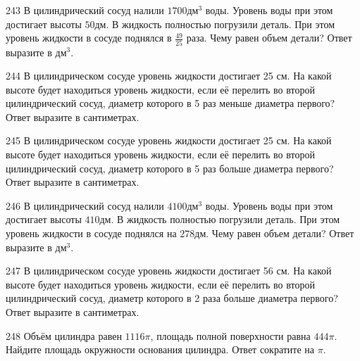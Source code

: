 \documentclass[4apaper]{article}
\begin{document}
\begin{taskBN}{243}
В цилиндрический сосуд налили $1700\mbox{дм}^3$ воды. Уровень воды при этом достигает высоты $50$дм. В жидкость полностью погрузили деталь. При этом уровень жидкости в сосуде поднялся в $\frac{49}{25}$ раза. Чему равен объем детали? Ответ выразите в $\mbox{дм}^3$.
\end{taskBN}

\begin{taskBN}{244}
В цилиндрическом сосуде уровень жидкости достигает 25 см. На какой высоте будет находиться уровень жидкости, если её перелить во второй цилиндрический сосуд, диаметр которого в 5 раз меньше диаметра первого? Ответ выразите в сантиметрах.
\end{taskBN}

\begin{taskBN}{245}
В цилиндрическом сосуде уровень жидкости достигает 25 см. На какой высоте будет находиться уровень жидкости, если её перелить во второй цилиндрический сосуд, диаметр которого в 5 раз больше диаметра первого? Ответ выразите в сантиметрах.
\end{taskBN}

\begin{taskBN}{246}
В цилиндрический сосуд налили $4100\mbox{дм}^3$ воды. Уровень воды при этом достигает высоты $410$дм. В жидкость полностью погрузили деталь. При этом уровень жидкости в сосуде поднялся на $278$дм. Чему равен объем детали? Ответ выразите в $\mbox{дм}^3$.
\end{taskBN}

\begin{taskBN}{247}
В цилиндрическом сосуде уровень жидкости достигает 56 см. На какой высоте будет находиться уровень жидкости, если её перелить во второй цилиндрический сосуд, диаметр которого в 2 раза больше диаметра первого? Ответ выразите в сантиметрах.
\end{taskBN}

\begin{taskBN}{248}
Объём цилиндра равен $1116\pi$, площадь полной поверхности равна $444\pi$. Найдите площадь окружности основания цилиндра. Ответ сократите на $\pi$.
\end{taskBN}
\end{document}
